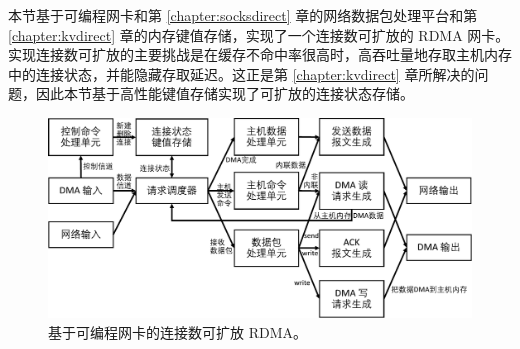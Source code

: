 






本节基于可编程网卡和第 \ref{chapter:socksdirect} 章的网络数据包处理平台和第 \ref{chapter:kvdirect} 章的内存键值存储，实现了一个连接数可扩放的 RDMA 网卡。
实现连接数可扩放的主要挑战是在缓存不命中率很高时，高吞吐量地存取主机内存中的连接状态，并能隐藏存取延迟。这正是第 \ref{chapter:kvdirect} 章所解决的问题，因此本节基于高性能键值存储实现了可扩放的连接状态存储。


\begin{figure}[htbp]
	\centering
	\includegraphics[width=1.0\textwidth]{images/scalable_rdma.pdf}	
	\caption{基于可编程网卡的连接数可扩放 RDMA。}
	\label{socksdirect:fig:scalable-rdma}
\end{figure}

